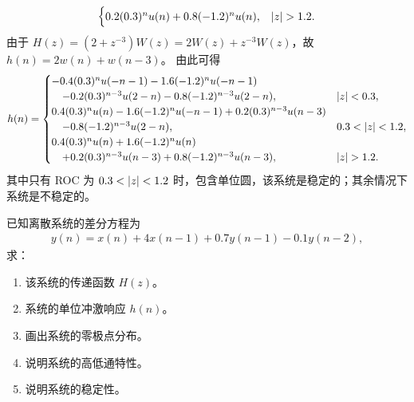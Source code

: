 \begin{solution}
\begin{enumerate}[label=(\arabic*)]
\begin{align*}
\begin{cases}
                        0.2(0.3)^nu(n) + 0.8(-1.2)^nu(n), & \left|z\right| > 1.2.
                    \end{cases}
            \end{align*}
            由于 $H(z) = (2 + z^{-3})W(z) = 2W(z) + z^{-3}W(z)$，故 $h(n) = 2w(n) + w(n - 3)$。
            由此可得
            \begin{align*}
                h(n) = \begin{cases}
                    -0.4(0.3)^nu(-n-1) - 1.6(-1.2)^nu(-n-1) \\
                    \quad - 0.2(0.3)^{n - 3}u(2 - n) - 0.8(-1.2)^{n - 3}u(2 - n), & \left|z\right| < 0.3, \\
                    0.4(0.3)^nu(n) - 1.6(-1.2)^nu(-n-1) + 0.2(0.3)^{n - 3}u(n - 3) \\
                    \quad - 0.8(-1.2)^{n - 3}u(2 - n), & 0.3 < \left|z\right| < 1.2, \\
                    0.4(0.3)^nu(n) + 1.6(-1.2)^nu(n) \\
                    \quad + 0.2(0.3)^{n - 3}u(n - 3) + 0.8(-1.2)^{n - 3}u(n - 3), & \left|z\right| > 1.2.
                \end{cases}
            \end{align*}
            其中只有 ROC 为 $0.3 < \left|z\right| < 1.2$ 时，包含单位圆，该系统是稳定的；其余情况下系统是不稳定的。
    \end{enumerate}
\end{solution}

\begin{homework}
    已知离散系统的差分方程为
    \begin{align*}
        y(n) = x(n) + 4x(n - 1) + 0.7y(n - 1) - 0.1y(n - 2),
    \end{align*}
    求：
    \begin{enumerate}[label=(\arabic*)]
        \item 该系统的传递函数 $H(z)$。
        \item 系统的单位冲激响应 $h(n)$。
        \item 画出系统的零极点分布。
        \item 说明系统的高低通特性。
        \item 说明系统的稳定性。
    \end{enumerate}
\end{homework}

